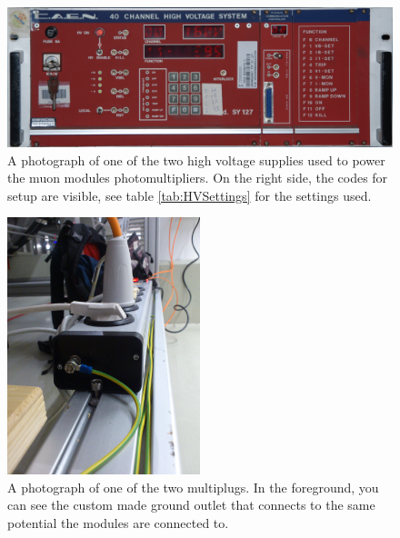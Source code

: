   \begin{figure}
  \centering
  
  	\includegraphics[width = \textwidth]{graphics/muonModules/mainSpec/HV.jpg}
  \caption[High voltage supplies]{A photograph of one of the two high voltage supplies used to power the muon modules photomultipliers. On the right side, the codes for setup are visible, see table \ref{tab:HVSettings} for the settings used.}
  \label{fig:HV}
  \end{figure}

  \begin{figure}
  \centering
  
  	\includegraphics[angle = 90, width = 0.5\textwidth]{graphics/muonModules/mainSpec/multiplug.jpg}
  \caption[Grounded multiplug]{A photograph of one of the two multiplugs. In the foreground, you can see the custom made ground outlet that connects to the same potential the modules are connected to.}
  \label{fig:multiplug}
  \end{figure}

